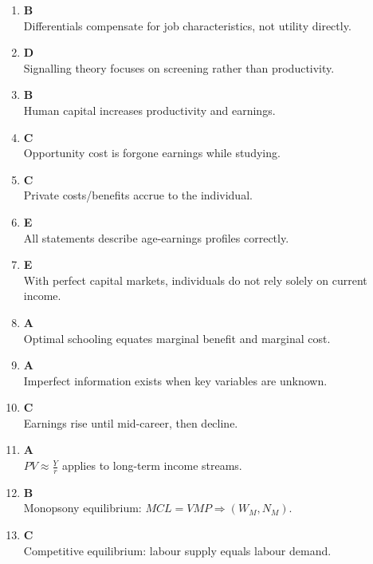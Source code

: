 \documentclass[12pt]{article}
\begin{document}
\begin{enumerate}
\item \textbf{B} \\
Differentials compensate for job characteristics, not utility directly.

\item \textbf{D} \\
Signalling theory focuses on screening rather than productivity.

\item \textbf{B} \\
Human capital increases productivity and earnings.

\item \textbf{C} \\
Opportunity cost is forgone earnings while studying.

\item \textbf{C} \\
Private costs/benefits accrue to the individual.

\item \textbf{E} \\
All statements describe age-earnings profiles correctly.

\item \textbf{E} \\
With perfect capital markets, individuals do not rely solely on current income.

\item \textbf{A} \\
Optimal schooling equates marginal benefit and marginal cost.

\item \textbf{A} \\
Imperfect information exists when key variables are unknown.

\item \textbf{C} \\
Earnings rise until mid-career, then decline.

\item \textbf{A} \\
$PV \approx \frac{Y}{r}$ applies to long-term income streams.

\item \textbf{B} \\
Monopsony equilibrium: $MCL = VMP \Rightarrow (W_M, N_M)$.

\item \textbf{C} \\
Competitive equilibrium: labour supply equals labour demand.


\end{enumerate}
\end{document}
